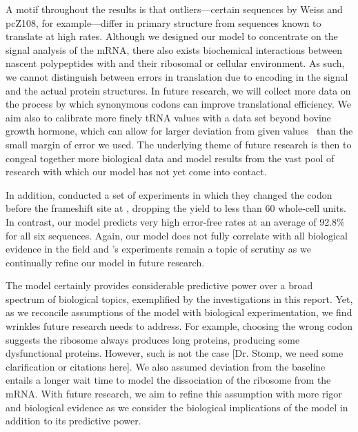 \documentclass[12pt]{article}
\numberwithin{equation}{section}
\begin{document}
A motif throughout the results is that outliers---certain sequences by
Weiss and pcZ108, for example---differ in primary structure from
sequences known to translate at high rates. Although we designed our
model to concentrate on the signal analysis of the mRNA, there also
exists biochemical interactions between nascent polypeptides with and
their ribosomal or cellular environment.  As such, we cannot
distinguish between errors in translation due to encoding in the
signal and the actual protein structures. In future research, we will
collect more data on the process by which synonymous codons can
improve translational efficiency. We aim also to calibrate more finely
tRNA values with a data set beyond bovine growth hormone, which can
allow for larger deviation from given values~\cite{lalit:embs} than
the small margin of error we used. The underlying theme of future
research is then to congeal together more biological data and model
results from the vast pool of research with which our model has not
yet come into contact.

In addition, \citet{weiss87} conducted a set of experiments in which
they changed the codon before the frameshift site at {},
dropping the yield to less than 60 whole-cell units. In contrast,
our model predicts very high error-free rates at an average of 92.8\%
for all six sequences. Again, our model does not fully correlate with
all biological evidence in the field and \citeauthor{weiss87}'s
experiments remain a topic of scrutiny as we continually refine our
model in future research.


The model certainly provides considerable predictive power over a broad spectrum
of biological topics, exemplified by the investigations in this report.  Yet,
as we reconcile assumptions of the model with biological
experimentation, we find wrinkles future research needs to address.
For example, choosing the wrong codon suggests the ribosome always produces
long proteins, producing some dysfunctional proteins. However, such is not the case
[Dr. Stomp, we need some clarification or citations here]. We also
assumed deviation from the baseline entails a longer wait time to
model the dissociation of the ribosome from the mRNA. With future
research, we aim to refine this assumption with more rigor and
biological evidence as we consider the biological implications of the model in addition
to its predictive power.

{}
\begin{singlespace}  \end{singlespace}
\end{document}
